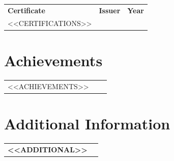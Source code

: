 \documentclass[a4paper,10pt]{article}
\begin{document}
\renewcommand{\arraystretch}{1.0}
\begin{tabular}{@{} p{8.2cm} >{\centering\arraybackslash}p{7.0cm} >{\raggedleft\arraybackslash}p{2.5cm} @{} }
\textbf{Certificate} & \textbf{Issuer} & \textbf{Year} \\[1pt]
<<CERTIFICATIONS>>
\end{tabular}

\section*{Achievements}

\begin{tabular}{@{} p{8.2cm} >{\centering\arraybackslash}p{7.0cm} >{\raggedleft\arraybackslash}p{2.5cm} @{} }
<<ACHIEVEMENTS>>
\end{tabular}

\section*{Additional Information}

\begin{tabular}{@{} >{\bfseries}p{3.8cm} p{13cm} @{} }
<<ADDITIONAL>>
\end{tabular}
\end{document}
